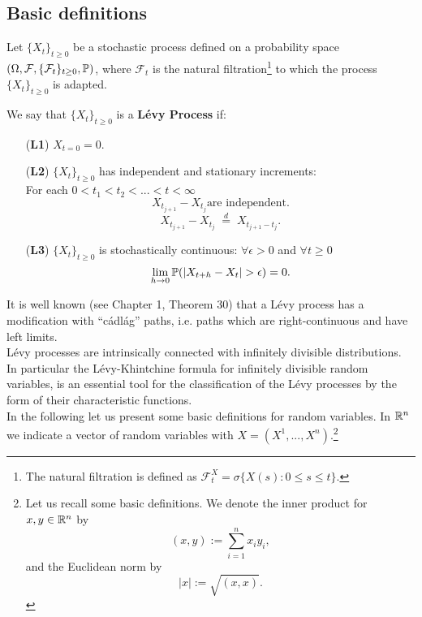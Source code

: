 \subsection{Basic definitions}

Let $\{X_t\}_{t \ge 0}$ be a stochastic process defined on a probability space $(\Omega,\mathcal{F},\{\mathcal{F}_t\}_{t \ge 0},\mathbb{P})$, 
where $\mathcal{F}_t$ is the natural filtration\footnote{The natural filtration is defined as $\mathcal{F}_{t}^X = \sigma\{X(s) :
0\leq s \leq t\} $.} to which the process $\{X_t\}_{t \ge 0}$ is adapted.\\ 
\begin{Definition}\label{LevyDef}
We say that $\{X_t\}_{t \ge 0}$ is a \textbf{Lévy Process} if:
\begin{itemize}
 \item[(\textbf{L1})] $X_{t=0} = 0$.
 \item[(\textbf{L2})] $\{X_t\}_{t \ge 0}$ has independent and stationary increments:\\ For each $0<t_1<t_2 <... <t<\infty$
   $$ X_{t_{j+1}} - X_{t_j} \mbox{are independent.} $$
   $$ X_{t_{j+1}} - X_{t_j} \; \overset{d}{=} \; X_{t_{j+1}- t_{j} }. $$ 
 \item[(\textbf{L3})] $\{X_t\}_{t \ge 0}$ is stochastically continuous: $\forall \epsilon > 0 $ and $\forall t \ge 0$  $$\lim_{h\to 0} \mathbb{P}(|X_{t+h}-X_t| > \epsilon)=0. $$ 
\end{itemize}
\end{Definition}
It is well known (see \cite{Protter} Chapter 1, Theorem 30) that a Lévy process has a modification with ``cádlág''
paths, i.e. paths which are right-continuous and have left limits. \\
Lévy processes are intrinsically connected with infinitely divisible distributions. In particular the Lévy-Khintchine formula 
for infinitely divisible random variables, is an essential tool for the classification of the Lévy processes by the form of their
characteristic functions.\\
In the following let us present some basic definitions for random variables. In $\mathbb{R}^n$ we indicate a vector of random variables with $X = (X^1, ..., X^n)$.\footnote{ 
Let us recall some basic definitions. We denote the inner product for $x,y \in \mathbb{R}^n$ by
$$(x,y) := \sum_{i=1}^n x_i y_i ,$$ and the Euclidean norm by $$|x| := \sqrt{(x,x)}.$$ }


